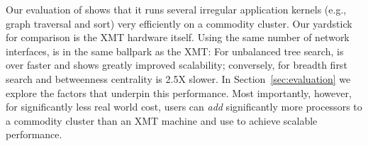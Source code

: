 Our evaluation of \Grappa shows that it runs several irregular application
kernels (e.g., graph traversal and sort) very efficiently on a commodity
cluster. Our yardstick for comparison is the XMT hardware itself. Using the
same number of network interfaces, \Grappa is in the same ballpark as the XMT:
For unbalanced tree search, \Grappa is over  faster and shows greatly
improved scalability; conversely, for breadth first search and betweenness
centrality \Grappa is 2.5X slower. In Section~\ref{sec:evaluation} we explore
the factors that underpin this performance. Most importantly, however, for
significantly less real world cost, users can \emph{add\/} significantly more
processors to a commodity cluster than an XMT machine and use \Grappa to
achieve scalable performance. 



